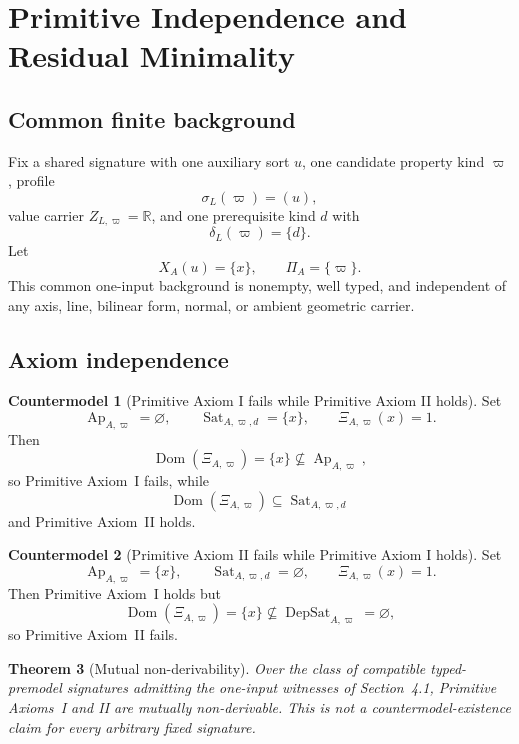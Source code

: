 \documentclass[11pt]{article}
\newcommand{\Ap}{\operatorname{Ap}}
\newcommand{\DepSat}{\operatorname{DepSat}}
\newcommand{\Sat}{\operatorname{Sat}}
\newcommand{\Dom}{\operatorname{Dom}}
\newtheorem{theorem}{Theorem}[section]
\theoremstyle{definition}
\newtheorem{countermodel}[theorem]{Countermodel}
\theoremstyle{remark}
\begin{document}
\section{Primitive Independence and Residual Minimality}
\label{sec:independence}

\subsection{Common finite background}

Fix a shared signature with one auxiliary sort \(u\), one candidate property kind \(\varpi\), profile
\[
\sigma_L(\varpi)=(u),
\]
value carrier \(Z_{L,\varpi}=\mathbb R\), and one prerequisite kind \(d\) with
\[
\delta_L(\varpi)=\{d\}.
\]
Let
\[
X_A(u)=\{x\},
\qquad
\Pi_A=\{\varpi\}.
\]
This common one-input background is nonempty, well typed, and independent of any axis, line, bilinear form, normal, or ambient geometric carrier.

\subsection{Axiom independence}

\begin{countermodel}[Primitive Axiom I fails while Primitive Axiom II holds]
\label{cm:pi}
Set
\[
\Ap_{A,\varpi}=\varnothing,
\qquad
\Sat_{A,\varpi,d}=\{x\},
\qquad
\Xi_{A,\varpi}(x)=1.
\]
Then
\[
\Dom(\Xi_{A,\varpi})=\{x\}\not\subseteq\Ap_{A,\varpi},
\]
so Primitive Axiom~I fails, while
\[
\Dom(\Xi_{A,\varpi})\subseteq\Sat_{A,\varpi,d}
\]
and Primitive Axiom~II holds.
\end{countermodel}

\begin{countermodel}[Primitive Axiom II fails while Primitive Axiom I holds]
\label{cm:pii}
Set
\[
\Ap_{A,\varpi}=\{x\},
\qquad
\Sat_{A,\varpi,d}=\varnothing,
\qquad
\Xi_{A,\varpi}(x)=1.
\]
Then Primitive Axiom~I holds but
\[
\Dom(\Xi_{A,\varpi})=\{x\}\not\subseteq\DepSat_{A,\varpi}=\varnothing,
\]
so Primitive Axiom~II fails.
\end{countermodel}

\begin{theorem}[Mutual non-derivability]
\label{thm:independence}
Over the class of compatible typed-premodel signatures admitting the one-input witnesses of Section~4.1, Primitive Axioms~I and II are mutually non-derivable. This is not a countermodel-existence claim for every arbitrary fixed signature.
\end{theorem}
\end{document}
